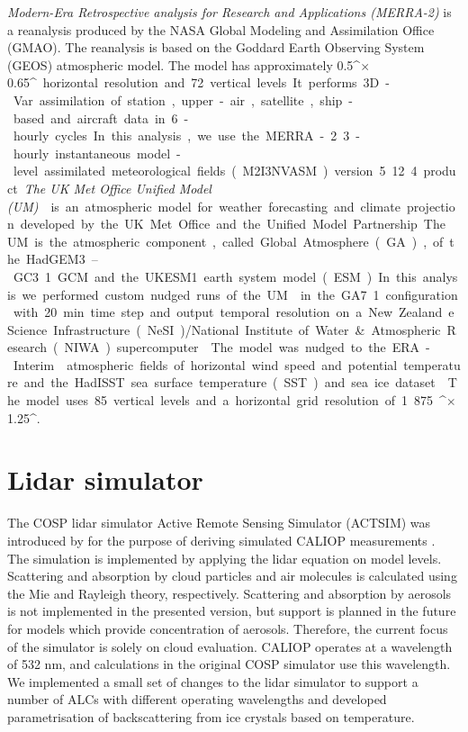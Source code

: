 \textit{Modern-Era Retrospective analysis for Research and Applications
(MERRA-2)} \citep{gelaro2017}
is a reanalysis produced by the NASA Global Modeling and Assimilation Office (GMAO).
The reanalysis is based on the Goddard Earth Observing System (GEOS) atmospheric
model. The model has approximately 0.5\unit{^\circ}$\times$0.65\unit{^\circ} horizontal
resolution and 72 vertical levels. It performs 3D-Var assimilation of
station, upper-air, satellite, ship-based and aircraft data in 6-hourly
cycles. In this analysis, we use the MERRA-2 3-hourly instantaneous
model-level assimilated meteorological fields (M2I3NVASM) version 5.12.4 product.

\textit{The UK Met Office Unified Model (UM)} \citep{walters2019}
is an atmospheric model for weather forecasting and climate projection
developed by the UK Met Office and the Unified Model Partnership. The UM is the atmospheric
component, called Global Atmosphere (GA), of the HadGEM3–GC3.1 GCM and the UKESM1
earth system model (ESM). In this analysis we performed custom nudged
runs of the UM \citep{telford2008} in the GA7.1 configuration with 20 min.
time step and output temporal resolution
on a New Zealand eScience Infrastructure (NeSI)/National Institute of Water \& Atmospheric Research (NIWA) supercomputer \citep{williams2016}.
The model was nudged to the ERA-Interim \citep{dee2011} atmospheric fields of horizontal wind speed and potential temperature and the HadISST sea surface temperature (SST) and sea ice dataset
\citep{rayner2003}. The model uses 85 vertical levels and a horizontal grid
resolution of 1.875\unit{^\circ}$\times$1.25\unit{^\circ}.

\section{Lidar simulator}
\label{sec:3:lidar-simulator}

The COSP lidar simulator Active Remote Sensing Simulator (ACTSIM) was
introduced by \cite{chiriaco2006} for the purpose
of deriving simulated CALIOP measurements \citep{chepfer2007,chepfer2008}.
The simulation is implemented by applying the lidar equation on model levels.
Scattering and absorption by cloud particles
and air molecules is calculated using the Mie and Rayleigh theory,
respectively. Scattering and absorption by aerosols is not implemented
in the presented version, but support is planned in the future
for models which provide concentration of aerosols. Therefore,
the current focus of the simulator is solely on cloud evaluation.
CALIOP operates at a wavelength of 532 nm, and
calculations in the original COSP simulator use this wavelength.
We implemented a small set of changes to the lidar simulator to support a
number of ALCs with different operating wavelengths and developed
parametrisation of backscattering from ice crystals based on temperature.

